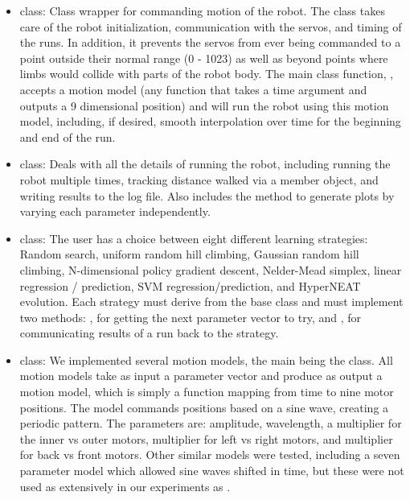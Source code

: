 \begin{itemize}

\item {} class: Class wrapper for commanding
  motion of the robot.  The  class takes care of the robot
  initialization, communication with the servos, and timing of the
  runs.  In addition, it prevents the servos from ever being commanded
  to a point outside their normal range (0 - 1023) as well as beyond
  points where limbs would collide with parts of the robot body.  The
  main class function, , accepts a motion model (any
  function that takes a time argument and outputs a 9 dimensional
  position) and will run the robot using this motion model, including,
  if desired, smooth interpolation over time for the beginning and end
  of the run.

\item {} class: Deals with all the details of running
  the robot, including running the robot multiple times, tracking
  distance walked via a  member object, and
  writing results to the log file. Also includes the
   method to generate plots by varying each
  parameter independently.

\item {} class: The user has a choice between eight
  different learning strategies: Random search, uniform random hill
  climbing, Gaussian random hill climbing, N-dimensional policy
  gradient descent, Nelder-Mead simplex, linear regression / prediction,
  SVM regression/prediction, and HyperNEAT evolution.  Each strategy
  must derive from the base  class and must implement
  two methods: , for getting the next parameter vector
  to try, and , for communicating results of a run
  back to the strategy.

\item {} class: We implemented several motion models,
  the main being the  class.  All motion models take
  as input a parameter vector and produce as output a motion model,
  which is simply a function mapping from time to nine motor
  positions.  The  model commands positions based on
  a sine wave, creating a periodic pattern. The parameters are:
  amplitude, wavelength, a multiplier for the inner vs outer motors,
  multiplier for left vs right motors, and multiplier for back vs
  front motors.  Other similar models were tested, including a seven
  parameter model which allowed sine waves shifted in time, but these
  were not used as extensively in our experiments as
  .


\end{itemize}
